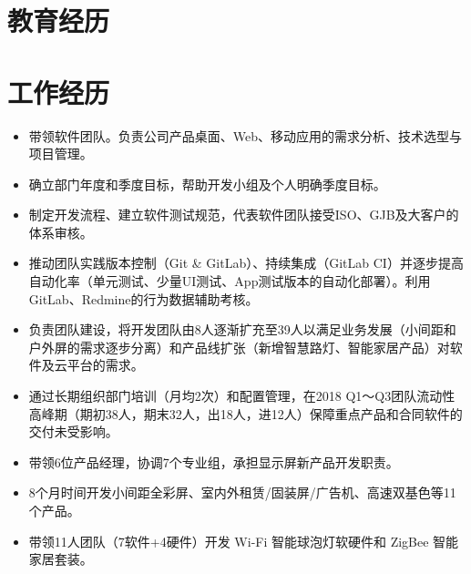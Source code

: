 \documentclass[11pt,a4paper]{moderncv/moderncv}
\begin{document}
\maketitle


\section{教育经历}

\section{工作经历}


{
\begin{itemize}
	\item 带领软件团队。负责公司产品桌面、Web、移动应用的需求分析、技术选型与项目管理。
	\item 确立部门年度和季度目标，帮助开发小组及个人明确季度目标。
	\item 制定开发流程、建立软件测试规范，代表软件团队接受ISO、GJB及大客户的体系审核。
	\item 推动团队实践版本控制（Git \& GitLab）、持续集成（GitLab CI）并逐步提高自动化率（单元测试、少量UI测试、App测试版本的自动化部署）。利用GitLab、Redmine的行为数据辅助考核。
	\item 负责团队建设，将开发团队由8人逐渐扩充至39人以满足业务发展（小间距和户外屏的需求逐步分离）和产品线扩张（新增智慧路灯、智能家居产品）对软件及云平台的需求。
	\item 通过长期组织部门培训（月均2次）和配置管理，在2018 Q1～Q3团队流动性高峰期（期初38人，期末32人，出18人，进12人）保障重点产品和合同软件的交付未受影响。
\end{itemize}
}

{
\begin{itemize}
	\item 带领6位产品经理，协调7个专业组，承担显示屏新产品开发职责。
	\item 8个月时间开发小间距全彩屏、室内外租赁/固装屏/广告机、高速双基色等11个产品。
	\item 带领11人团队（7软件+4硬件）开发 Wi-Fi 智能球泡灯软硬件和 ZigBee 智能家居套装。
\end{itemize}
}
\end{document}
